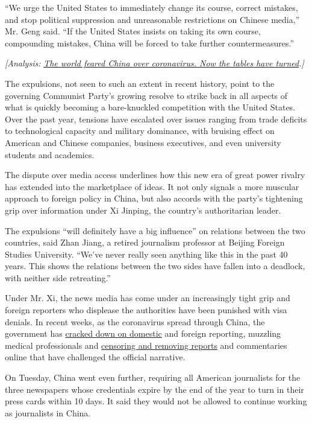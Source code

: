 ``We urge the United States to immediately change its course, correct
mistakes, and stop political suppression and unreasonable restrictions
on Chinese media,'' Mr. Geng said. ``If the United States insists on
taking its own course, compounding mistakes, China will be forced to
take further countermeasures.''

\emph{{[}Analysis:}
\href{http://www.nytimes.com/2020/03/19/world/asia/coronavirus-china-united-states.html}{\emph{The
world feared China over coronavirus. Now the tables have
turned}}\emph{.{]}}

The expulsions, not seen to such an extent in recent history, point to
the governing Communist Party's growing resolve to strike back in all
aspects of what is quickly becoming a bare-knuckled competition with the
United States. Over the past year, tensions have escalated over issues
ranging from trade deficits to technological capacity and military
dominance, with bruising effect on American and Chinese companies,
business executives, and even university students and academics.

The dispute over media access underlines how this new era of great power
rivalry has extended into the marketplace of ideas. It not only signals
a more muscular approach to foreign policy in China, but also accords
with the party's tightening grip over information under Xi Jinping, the
country's authoritarian leader.

The expulsions ``will definitely have a big influence'' on relations
between the two countries, said Zhan Jiang, a retired journalism
professor at Beijing Foreign Studies University. ``We've never really
seen anything like this in the past 40 years. This shows the relations
between the two sides have fallen into a deadlock, with neither side
retreating.''

Under Mr. Xi, the news media has come under an increasingly tight grip
and foreign reporters who displease the authorities have been punished
with visa denials. In recent weeks, as the coronavirus spread through
China, the government has
\href{https://www.nytimes.com/2020/03/14/business/media/coronavirus-china-journalists.html}{cracked
down on domestic} and foreign reporting, muzzling medical professionals
and
\href{https://www.nytimes.com/2020/03/16/business/china-coronavirus-internet-police.html}{censoring
and removing reports} and commentaries online that have challenged the
official narrative.

On Tuesday, China went even further, requiring all American journalists
for the three newspapers whose credentials expire by the end of the year
to turn in their press cards within 10 days. It said they would not be
allowed to continue working as journalists in China.

